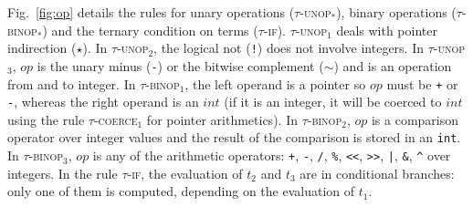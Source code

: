Fig.~\ref{fig:op} details the rules for unary operations
(\textsc{$\tau$-unop$_*$}),
binary operations (\textsc{$\tau$-binop$_*$}) and the ternary condition on terms
(\textsc{$\tau$-if}).
\textsc{$\tau$-unop$_1$} deals with pointer indirection ($\star$).
In \textsc{$\tau$-unop$_2$}, the logical not (\lstinline|!|) does not involve
integers.
In \textsc{$\tau$-unop$_3$}, $op$ is the unary minus (\lstinline|-|) or the
bitwise complement ($\sim$) and is an operation from and to integer.
In \textsc{$\tau$-binop$_1$}, the left operand is a pointer so $op$ must be
\lstinline|+| or \lstinline|-|, whereas the right operand is an $int$
(if it is an integer, it will be coerced to $int$ using the rule
\textsc{$\tau$-coerce$_1$} for pointer arithmetics).
In \textsc{$\tau$-binop$_2$}, $op$ is a comparison operator over integer values
and the result of the comparison is stored in an \lstinline|int|.
In \textsc{$\tau$-binop$_3$}, $op$ is any of the arithmetic
operators: \lstinline|+|, \lstinline|-|, \lstinline|/|, \lstinline|%|,
\lstinline|<<|, \lstinline|>>|, \lstinline{|}, \lstinline|&|, \lstinline|^|
over integers.
In the rule \textsc{$\tau$-if}, the evaluation of $t_2$ and $t_3$ are in
conditional branches: only one of them is computed, depending on the evaluation
of $t_1$.



